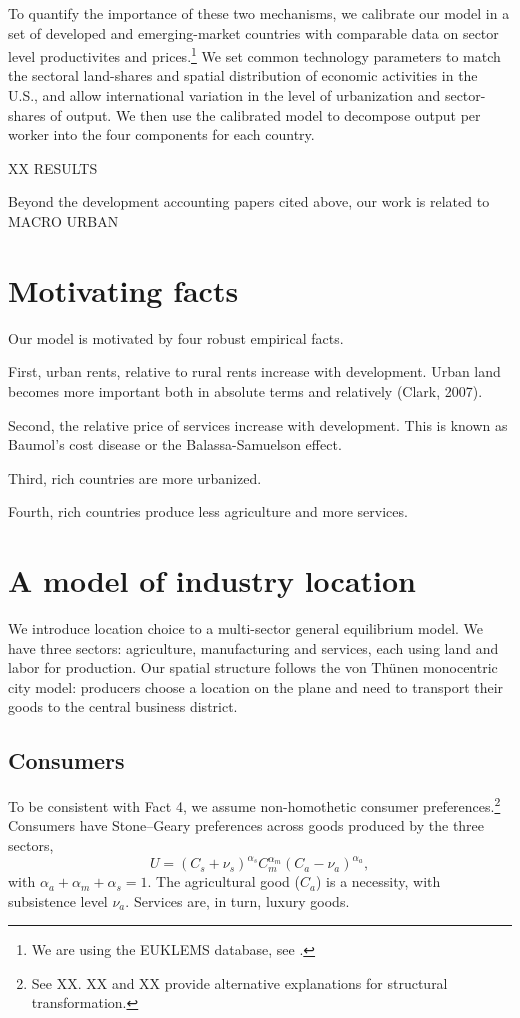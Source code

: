 \documentclass[12pt]{article}
\begin{document}
To quantify the importance of these two mechanisms, we calibrate our model in a set of developed and emerging-market countries with comparable data on sector level productivites and prices.\footnote{We are using the EUKLEMS database, see .} We set common technology parameters to match the sectoral land-shares and spatial distribution of economic activities in the U.S., and allow international variation in the level of urbanization and sector-shares of output. We then use the calibrated model to decompose output per worker into the four components for each country. 

XX RESULTS

\bigskip

Beyond the development accounting papers cited above, our work is related to MACRO URBAN


\section{Motivating facts}
Our model is motivated by four robust empirical facts.

First, urban rents, relative to rural rents increase with development. Urban land becomes more important both in absolute terms and relatively (Clark, 2007).

Second, the relative price of services increase with development. This is known as Baumol's cost disease or the Balassa-Samuelson effect.

Third, rich countries are more urbanized.

Fourth, rich countries produce less agriculture and more services.


\section{A model of industry location}
We introduce location choice to a multi-sector general equilibrium model. We have three sectors: agriculture, manufacturing and services, each using land and labor for production. Our spatial structure follows the von Thünen monocentric city model: producers choose a location on the plane and need to transport their goods to the central business district. %

\subsection{Consumers}
To be consistent with Fact 4, we assume non-homothetic consumer preferences.\footnote{See XX. XX and XX provide alternative explanations for structural transformation.} Consumers have Stone--Geary preferences across goods produced by the three sectors,
\begin{equation}
\label{eq:Utility}
U = (C_s+\nu_s)^{\alpha_s}C_m^{\alpha_m}(C_a-\nu_a)^{\alpha_a},
\end{equation}
with $\alpha_a+\alpha_m+\alpha_s=1$. The agricultural good ($C_a$) is a necessity, with subsistence level $\nu_a$. Services are, in turn, luxury goods.
\end{document}
